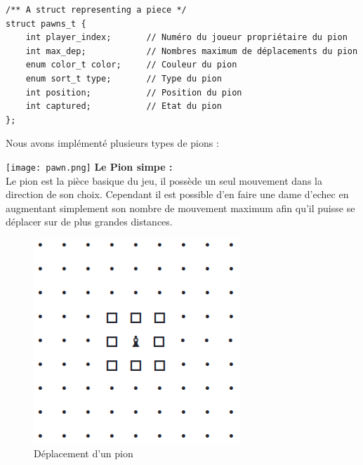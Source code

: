         \begin{lstlisting}
/** A struct representing a piece */
struct pawns_t {
    int player_index;       // Numéro du joueur propriétaire du pion
    int max_dep;            // Nombres maximum de déplacements du pion
    enum color_t color;     // Couleur du pion
    enum sort_t type;       // Type du pion
    int position;           // Position du pion
    int captured;           // Etat du pion
};\end{lstlisting}

        \noindent Nous avons implémenté plusieurs types de pions :
        \medbreak
            
        \texttt{[image: pawn.png]} \textbf{Le Pion simpe :} \\
        Le pion est la pièce basique du jeu, il possède un seul mouvement dans la direction de son choix. Cependant il est possible d'en faire une dame d'echec en augmentant simplement son nombre de mouvement maximum afin qu'il puisse se déplacer sur de plus grandes distances.
        \medbreak
         \begin{figure}[H]
                \centering
                \includegraphics[scale=0.3]{img/dep_pawn.png}
                \caption{Déplacement d'un pion}
                \label{fig:dep_pawn}
            \end{figure}
            
